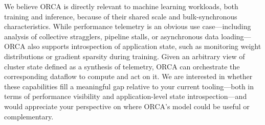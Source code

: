 \documentclass[ letterpaper, DIV=11, numbers=noendperiod]{scrartcl}
\begin{document}
We believe ORCA is directly relevant to machine learning workloads, both training and inference, because of their shared scale and bulk-synchronous characteristics.
While performance telemetry is an obvious use case---including
analysis of collective stragglers, pipeline stalls, or asynchronous data loading---
ORCA also supports introspection of application state, such as monitoring weight
distributions or gradient sparsity during training. Given an arbitrary view of
cluster state defined as a synthesis of telemetry, ORCA can orchestrate the corresponding dataflow to compute and act on it.
We are interested in whether these capabilities fill a meaningful gap relative to
your current tooling---both in terms of performance visibility and application-level
state introspection---and would appreciate your perspective on where ORCA’s
model could be useful or complementary.

\printbibliography
\end{document}
